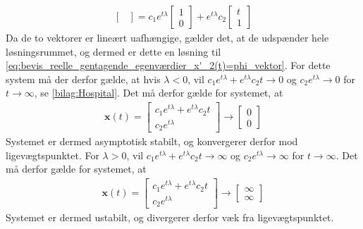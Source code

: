 \begin{bev}
\begin{itemize}
\begin{align*}
\begin{bmatrix}
                            \end{bmatrix} 
                    = c_1e^{t\lambda} 
                            \begin{bmatrix}
                                1 \\ 0 
                            \end{bmatrix} 
                     + e^{t\lambda} c_2 
                            \begin{bmatrix}
                                t \\ 1
                            \end{bmatrix}
    \end{align*}
    Da de to vektorer er lineært uafhængige, gælder det, at de udspænder hele løsningsrummet, og dermed er dette en løsning til \eqref{eq:bevis_reelle_gentagende_egenværdier_x'_2(t)=phi_vektor}. For dette system må der derfor gælde, at hvis $\lambda < 0$, vil $c_1e^{t\lambda} + e^{t\lambda}c_2t \to 0$ og $c_2e^{t\lambda} \to 0$ for $t \to \infty$, se \autoref{bilag:Hospital}. Det må derfor gælde for systemet, at 
    \begin{align*}
        \textbf{x}(t)   =     \begin{bmatrix}
                                c_1e^{t\lambda} + e^{t\lambda}c_2t\\
                                c_2e^{t\lambda}
                            \end{bmatrix} 
                            \to \begin{bmatrix}
                                0\\0
                            \end{bmatrix}
    \end{align*}
    Systemet er dermed asymptotisk stabilt, og konvergerer derfor mod ligevægtspunktet. 
    For $\lambda > 0$, vil $c_1e^{t\lambda} + e^{t\lambda}c_2t \to \infty$ og $c_2e^{t\lambda} \to \infty$ for $t \to \infty$. Det må derfor gælde for systemet, at 
    \begin{align*}
        \textbf{x}(t) = \begin{bmatrix}
                                c_1e^{t\lambda} + e^{t\lambda}c_2t\\
                                c_2e^{t\lambda}
                            \end{bmatrix} \to \begin{bmatrix}
                                \infty\\ \infty
                            \end{bmatrix}
    \end{align*}
    Systemet er dermed ustabilt, og divergerer derfor væk fra ligevægtspunktet. 
\end{itemize}
\end{bev}

